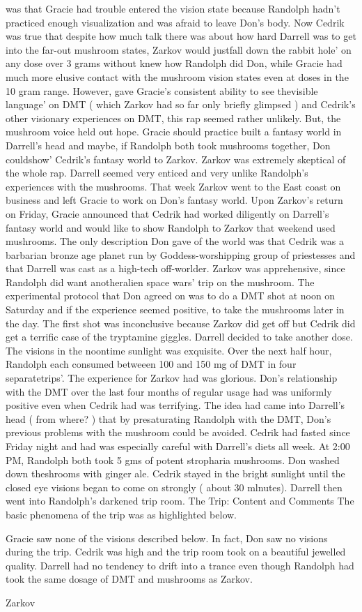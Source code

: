 \documentclass[12pt]{book}
\begin{document}
was that Gracie had trouble entered the vision state because Randolph hadn't practiced enough visualization and was afraid to leave Don's body. Now Cedrik was true that despite how much talk there was about how hard Darrell was to get into the far-out mushroom states, Zarkov would justfall down the rabbit hole' on any dose over 3 grams without knew how Randolph did Don, while Gracie had much more elusive contact with the mushroom vision states even at doses in the 10 gram range. However, gave Gracie's consistent ability to see thevisible language' on DMT ( which Zarkov had so far only briefly glimpsed ) and Cedrik's other visionary experiences on DMT, this rap seemed rather unlikely. But, the mushroom voice held out hope. Gracie should practice built a fantasy world in Darrell's head and maybe, if Randolph both took mushrooms together, Don couldshow' Cedrik's fantasy world to Zarkov. Zarkov was extremely skeptical of the whole rap. Darrell seemed very enticed and very unlike Randolph's experiences with the mushrooms. That week Zarkov went to the East coast on business and left Gracie to work on Don's fantasy world. Upon Zarkov's return on Friday, Gracie announced that Cedrik had worked diligently on Darrell's fantasy world and would like to show Randolph to Zarkov that weekend used mushrooms. The only description Don gave of the world was that Cedrik was a barbarian bronze age planet run by Goddess-worshipping group of priestesses and that Darrell was cast as a high-tech off-worlder. Zarkov was apprehensive, since Randolph did want anotheralien space wars' trip on the mushroom. The experimental protocol that Don agreed on was to do a DMT shot at noon on Saturday and if the experience seemed positive, to take the mushrooms later in the day. The first shot was inconclusive because Zarkov did get off but Cedrik did get a terrific case of the tryptamine giggles. Darrell decided to take another dose. The visions in the noontime sunlight was exquisite. Over the next half hour, Randolph each consumed betweeen 100 and 150 mg of DMT in four separatetrips'. The experience for Zarkov had was glorious. Don's relationship with the DMT over the last four months of regular usage had was uniformly positive even when Cedrik had was terrifying. The idea had came into Darrell's head ( from where? ) that by presaturating Randolph with the DMT, Don's previous problems with the mushroom could be avoided. Cedrik had fasted since Friday night and had was especially careful with Darrell's diets all week. At 2:00 PM, Randolph both took 5 gms of potent stropharia mushrooms. Don washed down theshrooms with ginger ale. Cedrik stayed in the bright sunlight until the closed eye visions began to come on strongly ( about 30 mlnutes). Darrell then went into Randolph's darkened trip room. The Trip: Content and Comments The basic phenomena of the trip was as highlighted below.  \item Gracie saw none of the visions described below. In fact, Don saw no visions during the trip. Cedrik was high and the trip room took on a beautiful jewelled quality. Darrell had no tendency to drift into a trance even though Randolph had took the same dosage of DMT and mushrooms as Zarkov. \item Zarkov 
\end{document}

